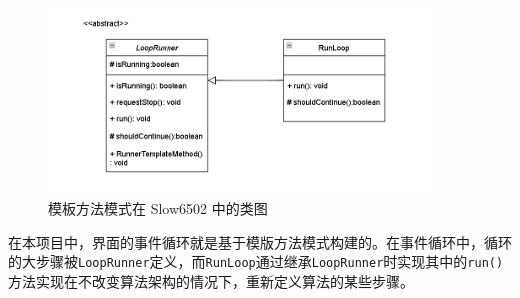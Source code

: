 \begin{figure}[H]
    \centering
    \includegraphics[width=0.9\textwidth]{figures/模板方法模式.png}
    \caption{模板方法模式在 Slow6502 中的类图}
\end{figure}

在本项目中，界面的事件循环就是基于模版方法模式构建的。在事件循环中，循环的大步骤被\lstinline{LoopRunner}定义，而\lstinline{RunLoop}通过继承\lstinline{LoopRunner}时实现其中的\lstinline{run()}方法实现在不改变算法架构的情况下，重新定义算法的某些步骤。
